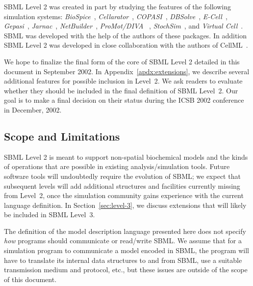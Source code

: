 \documentclass[10pt,twocolumntoc]{cekarticle}
\begin{document}
SBML Level 2 was created in part by studying the features of the
following simulation systems: \emph{BioSpice}~\citep{arkin:2001},
\emph{Cellarator}~\citep{shapiro:2000},
\emph{COPASI}~\citep{mendes:2000},
\emph{DBSolve}~\citep{goryanin:2001,goryanin:1999},
\emph{E-Cell}~\citep{tomita:1999,tomita:2001},
\emph{Gepasi}~\citep{mendes:1997,mendes:2001},
\emph{Jarnac}~\citep{sauro:2000,sauro:1991},
\emph{NetBuilder}~\citep{schilstra:2002},
\emph{ProMot/DIVA} ~\citep{trankle:1997},
 \emph{StochSim}~\citep{bray:2001,morton-firth:1998},
and \emph{Virtual Cell}~\citep{schaff:2000,schaff:2001}. SBML was
developed with the help of the authors of these packages.  In addition SBML
Level 2 was developed in close collaboration with the authors of
CellML~\citep{Physiome:2001}.

We hope to finalize the final form of the core of SBML Level 2 detailed in
this document in September 2002.  In Appendix~\ref{apdx:extensions}, we
describe several additional features for possible inclusion in Level~2.
We ask readers to evaluate whether they should be included in the final
definition of SBML Level~2.  Our goal is to make a final decision on
their status during the ICSB 2002 conference in December, 2002.


\subsection{Scope and Limitations}

SBML Level 2 is meant to support non-spatial biochemical models
and the kinds of operations that are possible in existing
analysis/simulation tools.  Future software tools will undoubtedly require the
evolution of SBML; we expect that subsequent levels will add
additional structures and facilities currently missing from
Level~2, once the simulation community gains experience with the
current language definition. In Section~\ref{sec:level-3}, we
discuss extensions that will likely be included in SBML Level~3.

The definition of the model description language presented here does not
specify \emph{how} programs should communicate or read/write SBML.  We
assume that for a simulation program to communicate a model encoded in
SBML, the program will have to translate its internal data structures to
and from SBML, use a suitable transmission medium and protocol, etc., but
these issues are outside of the scope of this document.
\end{document}
